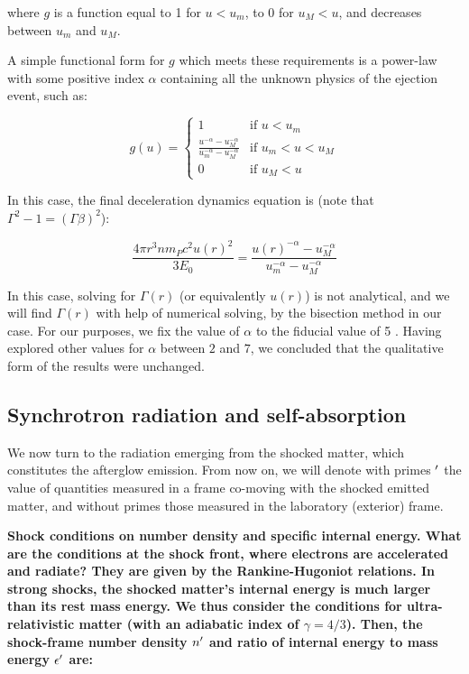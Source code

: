 where $g$ is a function equal to 1 for $u < u_m$, to 0 for $u_M < u$, and decreases between $u_m$ and $u_M$.

A simple functional form for $g$ which meets these requirements is a power-law with some positive index $\alpha$ containing all the unknown physics of the ejection event, such as:

\begin{equation}
    g(u) = \left \{ \begin{array}{cl}
    1 & \text{if } u < u_m \\
    \frac{u ^ {-\alpha} - u_M^{-\alpha}}{u_m ^ {-\alpha} - u_M ^ {-\alpha}} & \text{if } u_m < u < u_M \\
    0 & \text{if } u_M < u
\end{array}
    \end{equation}

In this case, the final deceleration dynamics equation is (note that $\Gamma^2 - 1 = (\Gamma\beta)^2$):

\begin{equation}\frac{4\pi r^3 n m_P c^2u(r)^2}{3 E_0} = \frac{u(r) ^ {-\alpha} - u_M^{-\alpha}}{u_m ^ {-\alpha} - u_M ^ {-\alpha}} \end{equation}

In this case, solving for $\Gamma(r)$ (or equivalently $u(r)$) is not analytical, and we will find $\Gamma(r)$ with help of numerical solving, by the bisection method in our case. For our purposes, we fix the value of $\alpha$ to the fiducial value of 5 \citep{13}. Having explored other values for $\alpha$ between $2$ and $7$, we concluded that the qualitative form of the results were unchanged.

\subsection{Synchrotron radiation and self-absorption}
We now turn to the radiation emerging from the shocked matter, which constitutes the afterglow emission. From now on, we will denote with primes $^{\prime}$ the value of quantities measured in a frame co-moving with the shocked emitted matter, and without primes those measured in the laboratory (exterior) frame.

\bf{Shock conditions on number density and specific internal energy. }What are the conditions at the shock front, where electrons are accelerated and radiate? They are given by the Rankine-Hugoniot \citep[e.g][chap. 15]{39} relations. In strong shocks, the shocked matter's internal energy is much larger than its rest mass energy. We thus consider the conditions for ultra-relativistic matter (with an adiabatic index of $\gamma = 4/3$). Then, the shock-frame number density $n^{\prime}$ and ratio of internal energy to mass energy $\epsilon^{\prime}$ are:

